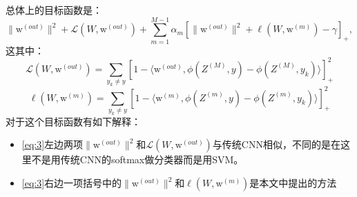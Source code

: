 \documentclass{article}
\begin{document}
\begin{CJK}{UTF8}{gbsn}
总体上的目标函数是：
\begin{equation}\label{eq:3}
 \|\mathrm{w}^{(out)}\|^2+\mathcal{L}(W,\mathrm{w}^{(out)})+\sum^{M-1}_{m=1}\alpha_m\left[\|\mathrm{w}^{(out)}\|^2+\ell(W,\mathrm{w}^{(m)})-\gamma\right]_+, \end{equation}
这其中：
\begin{equation}
\mathcal{L}(W,\mathrm{w}^{(out)})=\sum_{y_k\neq y}\left[1-\langle\mathrm{w}^{(out)},\phi(Z^{(M)},y)-\phi(Z^{(M)},y_k)\rangle\right]^2_+
\end{equation}
\begin{equation} 
\ell(W,\mathrm{w}^{(m)})=\sum_{y_k\neq y}\left[1-\langle\mathrm{w}^{(m)},\phi(Z^{(m)},y)-\phi(Z^{(m)},y_k)\rangle\right]^2_+
\end{equation}
对于这个目标函数有如下解释：
\begin{itemize}
\item\eqref{eq:3}左边两项$\|\mathrm{w}^{(out)}\|^2$和$\mathcal{L}(W,\mathrm{w}^{(out)})$与传统CNN相似，不同的是在这里不是用传统CNN的softmax做分类器而是用SVM。
\item\eqref{eq:3}右边一项括号中的$\|\mathrm{w}^{(out)}\|^2$和$\ell(W,\mathrm{w}^{(m)})$是本文中提出的方法
\end{itemize}









\end{CJK}
\end{document}
